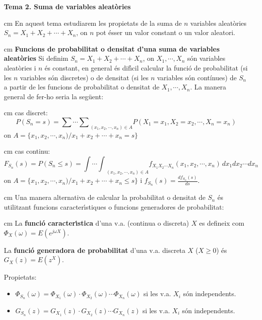 \documentclass{article}
\begin{document}
\textbf{\Large Tema 2. Suma de variables aleat\`ories}

 cm
En aquest tema estudiarem les propietats de la suma de $n$ variables aleat\`ories $S_n=X_1 + X_2 + \cdots + X_n$,
on $n$ pot \'esser un valor constant o un valor aleatori.

 cm
\noindent
\textbf{\large Funcions de probabilitat o densitat d'una suma de variables aleat\`ories}
\vskip 0.2cm
Si definim $S_n=X_1 + X_2 + \cdots + X_n$, on $X_1, \cdots, X_n$ s\'on variables aleat\`ories i $n$ \'es 
constant, en general \'es dif\'\i cil calcular la funci\'o de probabilitat (si les $n$ variables s\'on discretes)
o de densitat (si les $n$ variables s\'on cont\'inues) de $S_n$ a partir de les funcions de probabilitat
o densitat de $X_1, \cdots, X_n$. La manera general de fer-ho seria la seg\"uent:

 cm
cas discret:
\[
P(S_n=s)={\sum \cdots \sum}_{(x_1, x_2, \cdots, x_n) \in A} P(X_1=x_1, X_2=x_2, \cdots, X_n=x_n) 
\]
\indent
on $A=\{ x_1, x_2, \cdots, x_n) / x_1+x_2+\cdots+x_n=s \}$

 cm
cas continu:
\[
F_{S_n}(s)=P(S_n \leq s)=
{\int \cdots \int}_{(x_1, x_2, \cdots, x_n) \in A} f_{X_1 X_2 \cdots X_n}(x_1, x_2, \cdots, x_n) \, dx_1 dx_2 \cdots dx_n
\]
\indent
on $A=\{ x_1, x_2, \cdots, x_n) / x_1+x_2+\cdots+x_n \leq s \}$ i $f_{S_n}(s)=\frac{d f_{S_n}(s)}{ds}$.

 cm
Una manera alternativa de calcular la probabilitat o densitat de $S_n$ \'es utilitzant funcions caracter\'\i stiques
o funcions generadores de probabilitat:

 cm
La \textbf{funci\'o caracter\'\i stica} d'una v.a. (continua o discreta) $X$ es defineix com $\Phi_X(\omega)=E(e^{j\omega X})$.

La \textbf{funci\'o generadora de probabilitat} d'una v.a. discreta $X$ ($X \geq 0$) \'es $G_X(z)=E(z^X)$.

Propietats: 
\begin{itemize}
\item $\Phi_{S_n}(\omega)=\Phi_{X_1}(\omega) \cdot \Phi_{X_2}(\omega) \cdots \Phi_{X_n}(\omega)$ si les v.a. $X_i$ 
s\'on independents.
\item $G_{S_n}(z)=G_{X_1}(z) \cdot G_{X_2}(z) \cdots G_{X_n}(z)$ si les v.a. $X_i$ 
s\'on independents.
\end{itemize}
\end{document}
